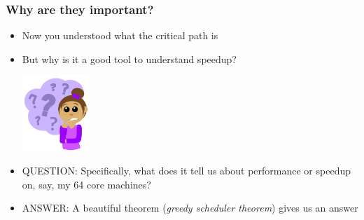 \documentclass[12pt,dvipdfmx]{beamer}
\newcommand{\ao}[1]{{\color{blue}#1}}
\newcommand{\aka}[1]{{\color{red}#1}}
\begin{document}
\begin{frame}
\frametitle{Why are they important?}

\begin{itemize}
\item<1-> Now you understood what the critical path is

\item<2-> But why is it a good tool to
  understand speedup?

\begin{center}
\includegraphics[width=0.2\textwidth]{out/pdf/svg/Question_Girl.pdf}  
\end{center}

\item<3-> \aka{QUESTION:} Specifically, what does it tell us about 
  performance or speedup on, say, my 64 core machines?

\item<4-> \ao{ANSWER:} A beautiful theorem 
  (\ao{\em greedy scheduler theorem}) gives us an answer
\end{itemize}
\end{frame}


\end{document}
